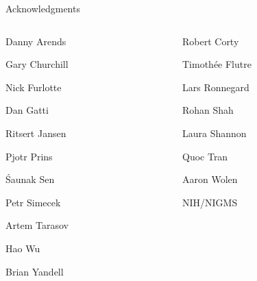 \documentclass[aspectratio=169,12pt,t]{beamer}
\begin{document}
\begin{frame}[c]{Acknowledgments}

\begin{columns}[T]
  \begin{column}[T]{0.5\textwidth}
    \vspace{0pt}
\bi
\item[] Danny Arends
\item[] Gary Churchill
\item[] Nick Furlotte
\item[] Dan Gatti
\item[] Ritsert Jansen
\item[] Pjotr Prins
\item[] \'Saunak Sen
\item[] Petr Simecek
\item[] Artem Tarasov
\item[] Hao Wu
\item[] Brian Yandell
  \ei
  \end{column} \hfill
\begin{column}[T]{0.5\textwidth}
\vspace*{0mm}

  \bi
\item[] Robert Corty
\item[] Timoth\'ee Flutre
\item[] Lars Ronnegard
\item[] Rohan Shah
\item[] Laura Shannon
\item[] Quoc Tran
\item[] Aaron Wolen
\item[]
\item[] NIH/NIGMS
  \ei
\end{column}
\end{columns}

\note{
}
\end{frame}
\end{document}
